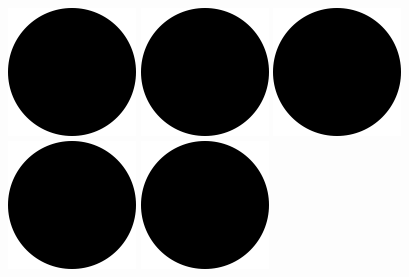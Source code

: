 \includegraphics[width=.40cm,height=.40cm]{images/rating/black_circle.png}
\hspace{0}
\includegraphics[width=.40cm,height=.40cm]{images/rating/black_circle.png}
\hspace{0}
\includegraphics[width=.40cm,height=.40cm]{images/rating/black_circle.png}
\hspace{0}
\includegraphics[width=.40cm,height=.40cm]{images/rating/black_circle.png}
\hspace{0}
\includegraphics[width=.40cm,height=.40cm]{images/rating/black_circle.png}